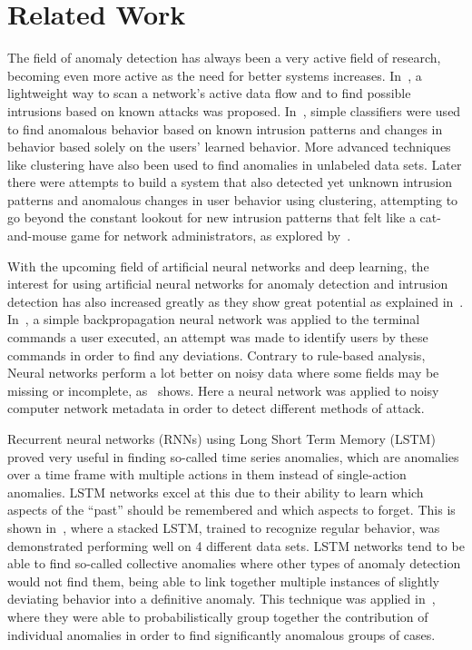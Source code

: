 \chapter{Related Work}\label{ch:related_work}

The field of anomaly detection has always been a very active field of research, becoming even more active as the need for better systems increases. In~\cite{roesch1999snort}, a lightweight way to scan a network's active data flow and to find possible intrusions based on known attacks was proposed. In~\cite{lee1998data}, simple classifiers were used to find anomalous behavior based on known intrusion patterns and changes in behavior based solely on the users' learned behavior. More advanced techniques like clustering have also been used to find anomalies in unlabeled data sets. Later there were attempts to build a system that also detected yet unknown intrusion patterns and anomalous changes in user behavior using clustering, attempting to go beyond the constant lookout for new intrusion patterns that felt like a cat-and-mouse game for network administrators, as explored by~\cite{Portnoy01intrusiondetection}.

With the upcoming field of artificial neural networks and deep learning, the interest for using artificial neural networks for anomaly detection and intrusion detection has also increased greatly as they show great potential as explained in~\cite{lecun2015deep}. In~\cite{ryan1998intrusion}, a simple backpropagation neural network was applied to the terminal commands a user executed, an attempt was made to identify users by these commands in order to find any deviations. Contrary to rule-based analysis, Neural networks perform a lot better on noisy data where some fields may be missing or incomplete, as~\cite{cannady1998artificial} shows. Here a neural network was applied to noisy computer network metadata in order to detect different methods of attack.

Recurrent neural networks (RNNs) using Long Short Term Memory (LSTM) proved very useful in finding so-called time series anomalies, which are anomalies over a time frame with multiple actions in them instead of single-action anomalies. LSTM networks excel at this due to their ability to learn which aspects of the \enquote{past} should be remembered and which aspects to forget. This is shown in~\cite{malhotra2015long}, where a stacked LSTM, trained to recognize regular behavior, was demonstrated performing well on 4 different data sets. LSTM networks tend to be able to find so-called collective anomalies where other types of anomaly detection would not find them, being able to link together multiple instances of slightly deviating behavior into a definitive anomaly. This technique was applied in~\cite{olsson2015probabilistic}, where they were able to probabilistically group together the contribution of individual anomalies in order to find significantly anomalous groups of cases.